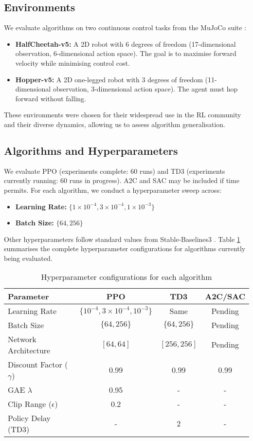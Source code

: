 \documentclass[12pt,a4paper]{report}
\begin{document}
\subsection{Environments}

We evaluate algorithms on two continuous control tasks from the MuJoCo suite \cite{todorov2012mujoco}:

\begin{itemize}
    \item \textbf{HalfCheetah-v5:} A 2D robot with 6 degrees of freedom (17-dimensional observation, 6-dimensional action space). The goal is to maximise forward velocity while minimising control cost.
    \item \textbf{Hopper-v5:} A 2D one-legged robot with 3 degrees of freedom (11-dimensional observation, 3-dimensional action space). The agent must hop forward without falling.
\end{itemize}

These environments were chosen for their widespread use in the RL community and their diverse dynamics, allowing us to assess algorithm generalisation.

\subsection{Algorithms and Hyperparameters}

We evaluate PPO (experiments complete: 60 runs) and TD3 (experiments currently running: 60 runs in progress). A2C and SAC may be included if time permits. For each algorithm, we conduct a hyperparameter sweep across:

\begin{itemize}
    \item \textbf{Learning Rate:} $\{1 \times 10^{-4}, 3 \times 10^{-4}, 1 \times 10^{-3}\}$
    \item \textbf{Batch Size:} $\{64, 256\}$
\end{itemize}

Other hyperparameters follow standard values from Stable-Baselines3 \cite{raffin2021sb3}. Table \ref{tab:hyperparams} summarises the complete hyperparameter configurations for algorithms currently being evaluated.

\begin{table}[h]
\centering
\caption{Hyperparameter configurations for each algorithm}
\label{tab:hyperparams}
\begin{tabular}{lccc}
\toprule
Parameter & PPO & TD3 & A2C/SAC \\
\midrule
Learning Rate & $\{10^{-4}, 3\times10^{-4}, 10^{-3}\}$ & Same & Pending \\
Batch Size & $\{64, 256\}$ & $\{64, 256\}$ & Pending \\
Network Architecture & $[64, 64]$ & $[256, 256]$ & Pending \\
Discount Factor ($\gamma$) & 0.99 & 0.99 & 0.99 \\
GAE $\lambda$ & 0.95 & - & - \\
Clip Range ($\epsilon$) & 0.2 & - & - \\
Policy Delay (TD3) & - & 2 & - \\
\bottomrule
\end{tabular}
\end{table}
\end{document}
